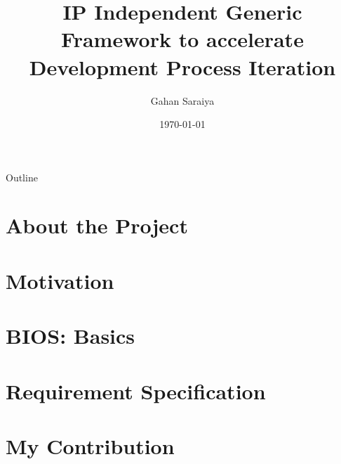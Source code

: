 \documentclass{beamer}
\title{IP Independent Generic Framework to accelerate Development Process Iteration}
\date{\today}
\author[Gahan Saraiya]{Gahan Saraiya}
\institute[18MCEC10]
{
  Institute of Technology\\
  Nirma University
}
\begin{document}
\begin{frame}
\titlepage
\end{frame}


    
\begin{frame}{Outline}
    \tableofcontents
\end{frame}

\section{About the Project}


\section{Motivation}


\section{BIOS: Basics}
% 


\section{Requirement Specification}


\section{My Contribution}


%
%
%
\end{document}
